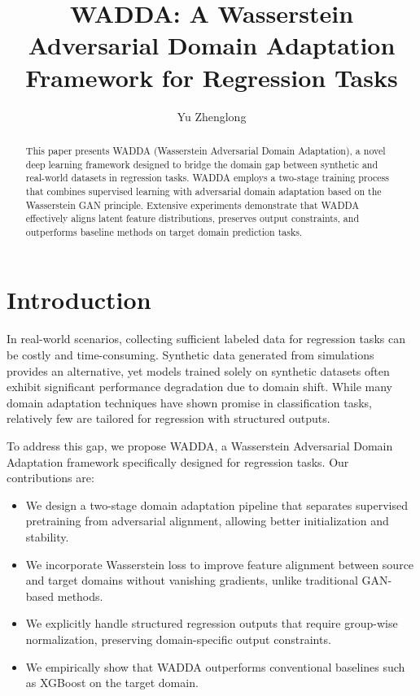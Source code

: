 \documentclass{article}
\title{WADDA: A Wasserstein Adversarial Domain Adaptation Framework for Regression Tasks}
\author{Yu Zhenglong}
\date{}
\begin{document}
\maketitle

\begin{abstract}
This paper presents WADDA (Wasserstein Adversarial Domain Adaptation), a novel deep learning framework designed to bridge the domain gap between synthetic and real-world datasets in regression tasks. WADDA employs a two-stage training process that combines supervised learning with adversarial domain adaptation based on the Wasserstein GAN principle. Extensive experiments demonstrate that WADDA effectively aligns latent feature distributions, preserves output constraints, and outperforms baseline methods on target domain prediction tasks.
\end{abstract}

\section{Introduction}
In real-world scenarios, collecting sufficient labeled data for regression tasks can be costly and time-consuming. Synthetic data generated from simulations provides an alternative, yet models trained solely on synthetic datasets often exhibit significant performance degradation due to domain shift. While many domain adaptation techniques have shown promise in classification tasks, relatively few are tailored for regression with structured outputs.

To address this gap, we propose WADDA, a Wasserstein Adversarial Domain Adaptation framework specifically designed for regression tasks. Our contributions are:
\begin{itemize}
  \item We design a two-stage domain adaptation pipeline that separates supervised pretraining from adversarial alignment, allowing better initialization and stability.
  \item We incorporate Wasserstein loss to improve feature alignment between source and target domains without vanishing gradients, unlike traditional GAN-based methods.
  \item We explicitly handle structured regression outputs that require group-wise normalization, preserving domain-specific output constraints.
  \item We empirically show that WADDA outperforms conventional baselines such as XGBoost on the target domain.
\end{itemize}
\end{document}
